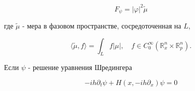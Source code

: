 \documentclass[10pt]{article}
\begin{document}
\[

F_{\psi}=|\varphi|^{2} \tilde{\mu}

\]



где $\tilde{\mu}$ - мера в фазовом пространстве, сосредоточенная на $L$,



\[

\langle\tilde{\mu}, f\rangle=\int_{L} f|\mu|, \quad f \in C_{0}^{\infty}\left(\mathbb{R}_{x}^{n} \times \mathbb{R}_{p}^{n}\right) .

\]



Если $\psi$ - решение уравнения Шредингера



\[

-i h \partial_{t} \psi+H\left(x,-i h \partial_{x}\right) \psi=0

\]
\end{document}
